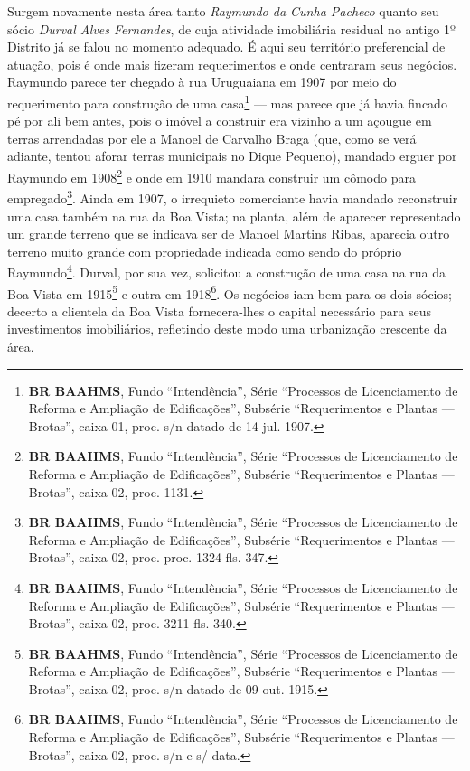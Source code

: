 Surgem novamente nesta área tanto \textit{Raymundo da Cunha Pacheco} quanto seu sócio \textit{Durval Alves Fernandes}, de cuja atividade imobiliária residual no antigo 1º Distrito já se falou no momento adequado. É aqui seu território preferencial de atuação, pois é onde mais fizeram requerimentos e onde centraram seus negócios. Raymundo parece ter chegado à rua Uruguaiana em 1907 por meio do requerimento para construção de uma casa\footnote{\textbf{BR BAAHMS}, Fundo ``Intendência'', Série ``Processos de Licenciamento de Reforma e Ampliação de Edificações'', Subsérie ``Requerimentos e Plantas --- Brotas'', caixa 01, proc. s/n datado de 14 jul. 1907.} --- mas parece que já havia fincado pé por ali bem antes, pois o imóvel a construir era vizinho a um açougue em terras arrendadas por ele a Manoel de Carvalho Braga (que, como se verá adiante, tentou aforar terras municipais no Dique Pequeno), mandado erguer por Raymundo em 1908\footnote{\textbf{BR BAAHMS}, Fundo ``Intendência'', Série ``Processos de Licenciamento de Reforma e Ampliação de Edificações'', Subsérie ``Requerimentos e Plantas --- Brotas'', caixa 02, proc. 1131.} e onde em 1910 mandara construir um cômodo para empregado\footnote{\textbf{BR BAAHMS}, Fundo ``Intendência'', Série ``Processos de Licenciamento de Reforma e Ampliação de Edificações'', Subsérie ``Requerimentos e Plantas --- Brotas'', caixa 02, proc. proc. 1324 fls. 347.}. Ainda em 1907, o irrequieto comerciante havia mandado reconstruir uma casa também na rua da Boa Vista; na planta, além de aparecer representado um grande terreno que se indicava ser de Manoel Martins Ribas, aparecia outro terreno muito grande com propriedade indicada como sendo do próprio Raymundo\footnote{\textbf{BR BAAHMS}, Fundo ``Intendência'', Série ``Processos de Licenciamento de Reforma e Ampliação de Edificações'', Subsérie ``Requerimentos e Plantas --- Brotas'', caixa 02, proc. 3211 fls. 340.}. Durval, por sua vez, solicitou a construção de uma casa na rua da Boa Vista em 1915\footnote{\textbf{BR BAAHMS}, Fundo ``Intendência'', Série ``Processos de Licenciamento de Reforma e Ampliação de Edificações'', Subsérie ``Requerimentos e Plantas --- Brotas'', caixa 02, proc. s/n datado de 09 out. 1915.} e outra em 1918\footnote{\textbf{BR BAAHMS}, Fundo ``Intendência'', Série ``Processos de Licenciamento de Reforma e Ampliação de Edificações'', Subsérie ``Requerimentos e Plantas --- Brotas'', caixa 02, proc. s/n e s/ data.}. Os negócios iam bem para os dois sócios; decerto a clientela da Boa Vista fornecera-lhes o capital necessário para seus investimentos imobiliários, refletindo deste modo uma urbanização crescente da área. 

